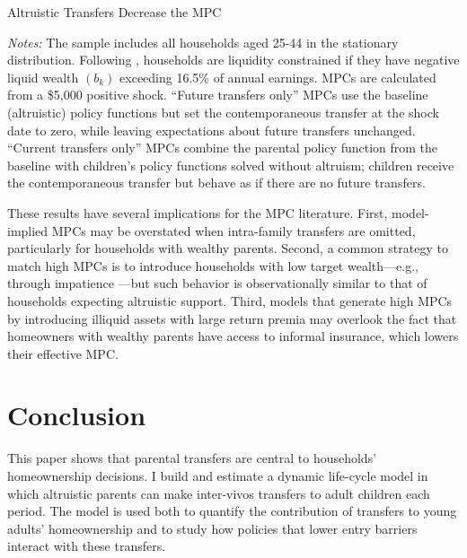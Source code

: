 \documentclass[12pt]{article}
\begin{document}
\begin{table}[tb]
	\center\singlespacing	
	\begin{threeparttable}[tb]
		\caption{Altruistic Transfers Decrease the MPC}
		
	\end{threeparttable}
	{\begin{footnotesize}\begin{flushleft}\vspace{-0.1in}
		\textit{Notes:} The sample includes all households aged 25-44 in the stationary distribution. Following \cite{Kaplan2014}, households are liquidity constrained if they have negative liquid wealth $(b_k)$ exceeding 16.5\% of annual earnings. MPCs are calculated from a \$5,000 positive shock. ``Future transfers only'' MPCs use the baseline (altruistic) policy functions but set the contemporaneous transfer at the shock date to zero, while leaving expectations about future transfers unchanged. ``Current transfers only'' MPCs combine the parental policy function from the baseline with children’s policy functions solved without altruism; children receive the contemporaneous transfer but behave as if there are no future transfers. \end{flushleft}\end{footnotesize}}			
\end{table}

These results have several implications for the MPC literature. First, model-implied MPCs may be overstated when intra-family transfers are omitted, particularly for households with wealthy parents. Second, a common strategy to match high MPCs is to introduce households with low target wealth—e.g., through impatience \citep{aguiar2024hand}—but such behavior is observationally similar to that of households expecting altruistic support. Third, models that generate high MPCs by introducing illiquid assets with large return premia \citep{kaplan2022marginal} may overlook the fact that homeowners with wealthy parents have access to informal insurance, which lowers their effective MPC. 

\section{Conclusion}
This paper shows that parental transfers are central to households’ homeownership decisions. I build and estimate a dynamic life-cycle model in which altruistic parents can make inter-vivos transfers to adult children each period. The model is used both to quantify the contribution of transfers to young adults’ homeownership and to study how policies that lower entry barriers interact with these transfers.
\end{document}

